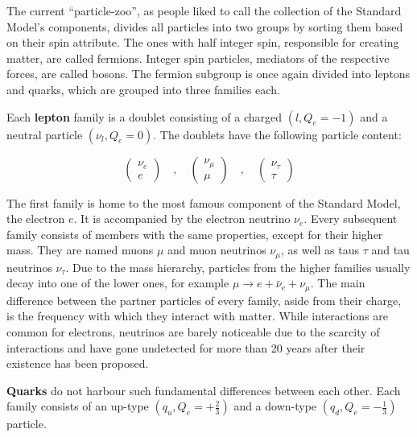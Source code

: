 \noindent The current ``particle-zoo'', as people liked to call the collection of the Standard Model's components, divides all particles into two groups by sorting them based on their spin attribute. The ones with half integer spin, responsible for creating matter, are called fermions. Integer spin particles, mediators of the respective forces, are called bosons. The fermion subgroup is once again divided into leptons and quarks, which are grouped into three families each.

Each \textbf{lepton} family is a doublet consisting of a charged $( l, Q_e = -1 )$ and a neutral particle $( \nu_l, Q_e = 0 )$. The doublets have the following particle content:

\begin{equation*}
  \begin{pmatrix}
    \nu_e \\
    e
  \end{pmatrix}
  \quad , \quad
  \begin{pmatrix}
    \nu_\mu \\
    \mu
  \end{pmatrix}
  \quad , \quad
  \begin{pmatrix}
    \nu_\tau \\
    \tau
  \end{pmatrix}
\end{equation*}

The first family is home to the most famous component of the Standard Model, the electron $e$. It is accompanied by the electron neutrino $\nu_e$. Every subsequent family consists of members with the same properties, except for their higher mass. They are named muons $\mu$ and muon neutrinos $\nu_\mu$, as well as taus $\tau$ and tau neutrinos $\nu_\tau$. Due to the mass hierarchy, particles from the higher families usually decay into one of the lower ones, for example $\mu \rightarrow e + \bar{\nu}_e + \nu_\mu$. The main difference between the partner particles of every family, aside from their charge, is the frequency with which they interact with matter. While interactions are common for electrons, neutrinos are barely noticeable due to the scarcity of interactions and have gone undetected for more than 20 years after their existence has been proposed.

\textbf{Quarks} do not harbour such fundamental differences between each other. Each family consists of an up-type $( q_u, Q_e = +\frac{2}{3} )$ and a down-type $( q_d, Q_e = -\frac{1}{3} )$ particle. 

